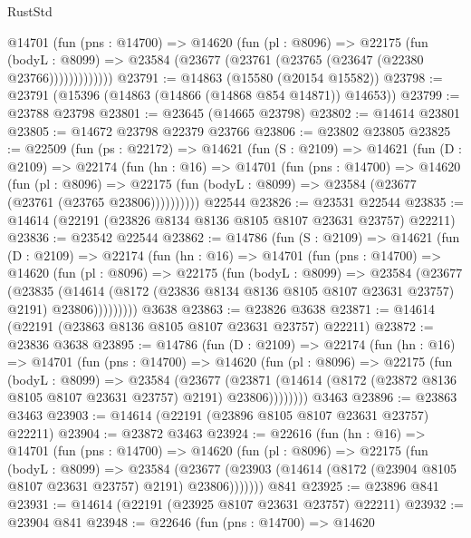 \begin{lexlean}{RustStd}
\begin{coremodule}
            @14701
              (fun (pns : @14700) =>
              @14620
                (fun (pl : @8096) =>
                @22175
                  (fun (bodyL : @8099) =>
                  @23584 (@23677 (@23761 (@23765 (@23647 (@22380 @23766)))))))))))))
@23791 := @14863 (@15580 (@20154 @15582))
@23798 := @23791 (@15396 (@14863 (@14866 (@14868 @854 @14871)) @14653))
@23799 := @23788 @23798
@23801 := @23645 (@14665 @23798)
@23802 := @14614 @23801
@23805 := @14672 @23798 @22379 @23766
@23806 := @23802 @23805
@23825 := @22509
    (fun (ps : @22172) =>
    @14621
      (fun (S : @2109) =>
      @14621
        (fun (D : @2109) =>
        @22174
          (fun (hn : @16) =>
          @14701
            (fun (pns : @14700) =>
            @14620
              (fun (pl : @8096) =>
              @22175 (fun (bodyL : @8099) => @23584 (@23677 (@23761 (@23765 @23806))))))))))
    @22544
@23826 := @23531 @22544
@23835 := @14614 (@22191 (@23826 @8134 @8136 @8105 @8107 @23631 @23757) @22211)
@23836 := @23542 @22544
@23862 := @14786
    (fun (S : @2109) =>
    @14621
      (fun (D : @2109) =>
      @22174
        (fun (hn : @16) =>
        @14701
          (fun (pns : @14700) =>
          @14620
            (fun (pl : @8096) =>
            @22175
              (fun (bodyL : @8099) =>
              @23584
                (@23677
                  (@23835
                    (@14614
                      (@8172 (@23836 @8134 @8136 @8105 @8107 @23631 @23757) @2191)
                      @23806)))))))))
    @3638
@23863 := @23826 @3638
@23871 := @14614 (@22191 (@23863 @8136 @8105 @8107 @23631 @23757) @22211)
@23872 := @23836 @3638
@23895 := @14786
    (fun (D : @2109) =>
    @22174
      (fun (hn : @16) =>
      @14701
        (fun (pns : @14700) =>
        @14620
          (fun (pl : @8096) =>
          @22175
            (fun (bodyL : @8099) =>
            @23584
              (@23677
                (@23871
                  (@14614 (@8172 (@23872 @8136 @8105 @8107 @23631 @23757) @2191) @23806))))))))
    @3463
@23896 := @23863 @3463
@23903 := @14614 (@22191 (@23896 @8105 @8107 @23631 @23757) @22211)
@23904 := @23872 @3463
@23924 := @22616
    (fun (hn : @16) =>
    @14701
      (fun (pns : @14700) =>
      @14620
        (fun (pl : @8096) =>
        @22175
          (fun (bodyL : @8099) =>
          @23584
            (@23677 (@23903 (@14614 (@8172 (@23904 @8105 @8107 @23631 @23757) @2191) @23806)))))))
    @841
@23925 := @23896 @841
@23931 := @14614 (@22191 (@23925 @8107 @23631 @23757) @22211)
@23932 := @23904 @841
@23948 := @22646
    (fun (pns : @14700) =>
    @14620

\end{coremodule}
\end{lexlean}
